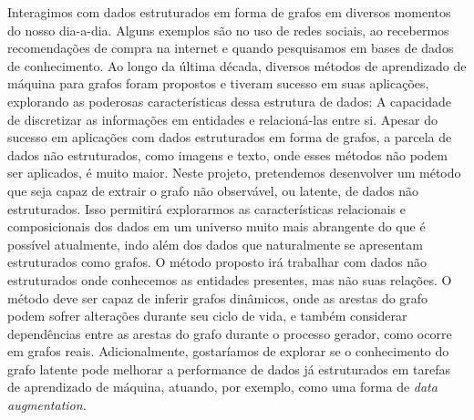 Interagimos com dados estruturados em forma de grafos em diversos momentos do nosso dia-a-dia. Alguns exemplos são no uso de redes sociais, ao recebermos recomendações de compra na internet e quando pesquisamos em bases de dados de conhecimento.
%
Ao longo da última década, diversos métodos de aprendizado de máquina para grafos foram propostos e tiveram sucesso em suas aplicações, explorando as poderosas características dessa estrutura de dados: A capacidade de discretizar as informações em entidades e relacioná-las entre si.
%
Apesar do sucesso em aplicações com dados estruturados em forma de grafos, a parcela de dados não estruturados, como imagens e texto, onde esses métodos não podem ser aplicados, é muito maior.
%
Neste projeto, pretendemos desenvolver um método que seja capaz de extrair o grafo não observável, ou latente, de dados não estruturados.
%
Isso permitirá explorarmos as características relacionais e composicionais dos dados em um universo muito mais abrangente do que é possível atualmente, indo além dos dados que naturalmente se apresentam estruturados como grafos. 
%
O método proposto irá trabalhar com dados não estruturados onde conhecemos as entidades presentes, mas não suas relações. 
%
O método deve ser capaz de inferir grafos dinâmicos, onde as arestas do grafo podem sofrer alterações durante seu ciclo de vida, e também considerar dependências entre as arestas do grafo durante o processo gerador, como ocorre em grafos reais. 
%
Adicionalmente, gostaríamos de explorar se o conhecimento do grafo latente pode melhorar a performance de dados já estruturados em tarefas de aprendizado de máquina, atuando, por exemplo, como uma forma de \emph{data augmentation}.